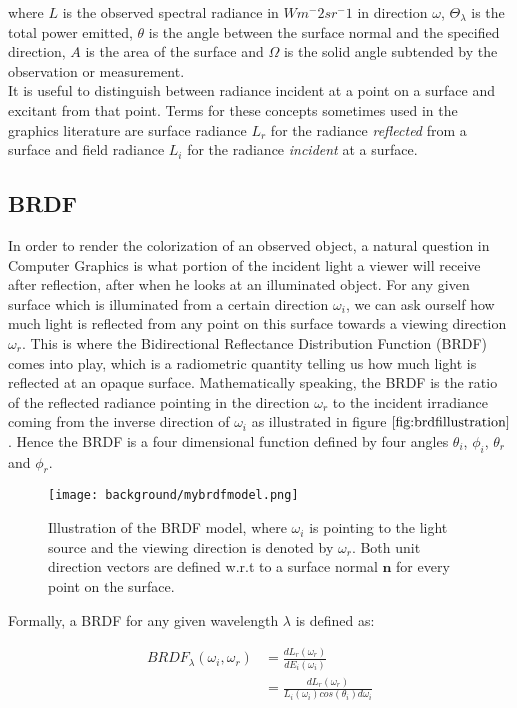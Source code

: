 where $L$ is the observed spectral radiance in $Wm^-2 sr^-1$ in direction $\omega$, $\Theta_{\lambda}$ is the total power emitted, $\theta$ is the angle between the surface normal and the specified direction, $A$ is the area of the surface and $\Omega$ is the solid angle subtended by the observation or measurement. \\

It is useful to distinguish between radiance incident at a point on a surface and excitant from that point. Terms for these concepts sometimes used in the graphics literature are surface radiance $L_r$ for the radiance \textit{reflected} from a surface and field radiance $L_i$ for the radiance \textit{incident} at a surface.  

\subsection{BRDF}
In order to render the colorization of an observed object, a natural question in Computer Graphics is what portion of the incident light a viewer will receive after reflection, after when he looks at an illuminated object. For any given surface which is illuminated from a certain direction $\omega_i$, we can ask ourself how much light is reflected from any point on this surface towards a viewing direction $\omega_r$. This is where the Bidirectional Reflectance Distribution Function (BRDF) comes into play, which is a radiometric quantity telling us how much light is reflected at an opaque surface. Mathematically speaking, the BRDF is the ratio of the reflected radiance pointing in the direction $\omega_r$ to the incident irradiance coming from the inverse direction of $\omega_i$ as illustrated in figure $\ref{fig:brdfillustration}$. Hence the BRDF is a four dimensional function defined by four angles $\theta_i$, $\phi_i$, $\theta_r$ and $\phi_r$.

\begin{figure}[ht]
  \centering
  \texttt{[image: background/mybrdfmodel.png]}
  \caption[BRDF Model]{Illustration of the BRDF model, where $\omega_i$ is pointing to the light source and the viewing direction is denoted by $\omega_r$. Both unit direction vectors are defined w.r.t to a surface normal $\mathbf{n}$ for every point on the surface.}
  \label{fig:brdfillustration}  
\end{figure}

Formally, a BRDF for any given wavelength $\lambda$ is defined as:

\begin{align}
  BRDF_{\lambda}(\omega_i, \omega_r)
  & = \frac{dL_r(\omega_r)}{dE_i(\omega_i)} \nonumber \\
  & = \frac{dL_r(\omega_r)}{L_i(\omega_i)cos(\theta_i)d\omega_i}
  \label{eq:defbrdf}
\end{align}

